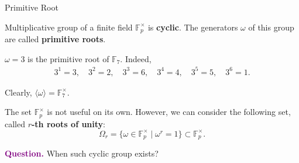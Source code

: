\documentclass{zkdl-presentation-template}
\begin{document}
    \begin{frame}{Primitive Root}
        \begin{theorem}
            Multiplicative group of a finite field $\mathbb{F}^{\times}_p$ is
            \textbf{cyclic}. The generators $\omega$ of this group are called
            \textbf{primitive roots}.\pause
        \end{theorem}

        \begin{example}
            $\omega=3$ is the primitive root of $\mathbb{F}_7$. Indeed,
            \begin{align*}
                3^1 = 3, \quad 3^2 = 2, \quad 3^3 = 6, \quad 3^4 = 4, \quad 3^5 = 5, \quad 3^6 = 1.
            \end{align*} 

            Clearly, $\langle \omega \rangle = \mathbb{F}_7^{\times}$.\pause
        \end{example}

        The set $\mathbb{F}^{\times}_p$ is not useful on its own. However, we
        can consider the following set, called \textbf{$r$-th roots of unity}:
        \begin{equation*}
            \Omega_r = \{ \omega \in \mathbb{F}^{\times}_p \mid \omega^r = 1 \} \subset \mathbb{F}_p^{\times}.
        \end{equation*}

        \vspace{-15px}

        \pause\textcolor{purple}{\textbf{Question.}} When such cyclic group exists?
    \end{frame}
\end{document}
